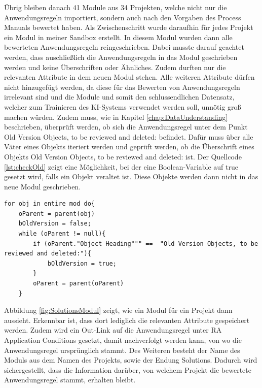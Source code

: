 Übrig bleiben danach 41 Module aus 34 Projekten, welche nicht nur die Anwendungsregeln importiert, sondern auch nach den Vorgaben des Process Manuals bewertet haben. Als Zwischenschritt wurde daraufhin
für jedes Projekt ein Modul in meiner Sandbox erstellt. In diesem Modul wurden dann alle bewerteten Anwendungsregeln reingeschrieben. Dabei musste darauf geachtet werden, dass auschließlich die
Anwendungsregeln in das Modul geschrieben werden und keine Überschriften oder Ähnliches. Zudem durften nur die relevanten Attribute in dem neuen Modul stehen. Alle weiteren Attribute dürfen nicht
hinzugefügt werden, da diese für das Bewerten von Anwendungsregeln irrelevant sind und die Module und somit den schlussendlichen Datensatz, welcher zum Trainieren des KI-Systems verwendet werden soll,
unnötig groß machen würden. Zudem muss, wie in Kapitel \ref*{chap:DataUnderstanding} beschrieben, überprüft werden, ob sich die Anwendungsregel unter dem Punkt 
\glqq Old Version Objects, to be reviewed and deleted: \grqq{} befindet. Dafür muss über alle Väter eines Objekts iteriert werden und geprüft werden, ob die Überschrift eines Objekts 
\glqq Old Version Objects, to be reviewed and deleted: \grqq{} ist. Der Quellcode \ref*{lst:checkOld} zeigt eine Möglichkeit, bei der eine Boolean-Variable auf true gesetzt wird, falls ein Objekt
veraltet ist. Diese Objekte werden dann nicht in das neue Modul geschrieben.

\begin{lstlisting}[caption={Prüfen, ob Objekt veraltet ist}, captionpos=b, label = lst:checkOld] 
for obj in entire mod do{ 
    oParent = parent(obj)
    bOldVersion = false;
    while (oParent != null){
        if (oParent."Object Heading""" ==  "Old Version Objects, to be reviewed and deleted:"){
            bOldVersion = true;
        }
        oParent = parent(oParent)
    }
\end{lstlisting}

Abbildung \ref*{fig:SolutionsModul} zeigt, wie ein Modul für ein Projekt dann aussieht. Erkennbar ist, dass dort lediglich die relevanten Attribute gespeichert werden. Zudem wird ein Out-Link auf die
Anwendungsregel unter RA Application Conditions gesetzt, damit nachverfolgt werden kann, von wo die Anwendungsregel ursprünglich stammt. Des Weiteren besteht der Name des Moduls aus dem Namen
des Projekts, sowie der Endung  Solutions. Dadurch wird sichergestellt, dass die Information darüber, von welchem Projekt die bewertete Anwendungsregel stammt, erhalten bleibt.

